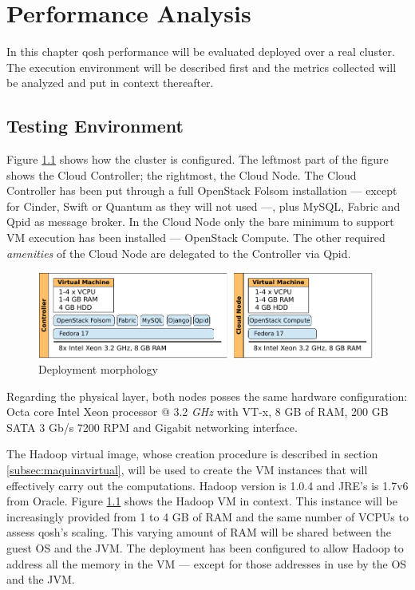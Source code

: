\chapter{Performance Analysis}\label{cap:rendimiento}
\noindent In this chapter qosh performance will be evaluated deployed over a real cluster. The execution environment will be described first and the metrics collected will be analyzed and put in context thereafter.

\section{Testing Environment}\label{sec:entornodeprueba}
\noindent Figure \ref{fig:clusterdespliegue} shows how the cluster is configured. The leftmost part of the figure shows the Cloud Controller; the rightmost, the Cloud Node. The Cloud Controller has been put through a full OpenStack Folsom installation --- except for Cinder, Swift or Quantum as they will not used ---, plus MySQL, Fabric and Qpid as message broker. In the Cloud Node only the bare minimum to support VM execution has been installed --- OpenStack Compute. The other required \emph{amenities} of the Cloud Node are delegated to the Controller via Qpid.

\begin{figure}[tbp]
\begin{center}
\includegraphics[width=0.99\textwidth]{imagenes/038.pdf}
 \caption{Deployment morphology}
\label{fig:clusterdespliegue}
\end{center}
\end{figure}

Regarding the physical layer, both nodes posses the same hardware configuration: Octa core Intel Xeon processor @ 3.2 \emph{GHz} with VT-x, 8 GB of RAM, 200 GB SATA 3 Gb/s 7200 RPM and Gigabit networking interface.

The Hadoop virtual image, whose creation procedure is described in section \ref{subsec:maquinavirtual}, will be used to create the VM instances that will effectively carry out the computations. Hadoop version is 1.0.4 and JRE's is 1.7v6 from Oracle. Figure \ref{fig:clusterdespliegue} shows the Hadoop VM in context. This instance will be increasingly provided from 1 to 4 GB of RAM and the same number of VCPUs to assess qosh's scaling. This varying amount of RAM will be shared between the guest OS and the JVM. The deployment has been configured to allow Hadoop to address all the memory in the VM --- except for those addresses in use by the OS and the JVM.

